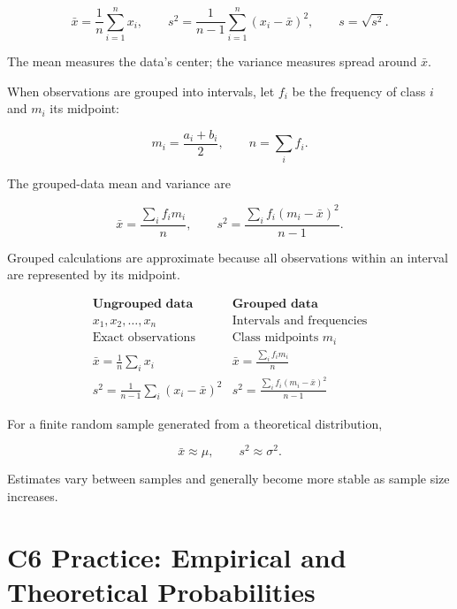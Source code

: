 $$
\bar{x}
=
\frac{1}{n}\sum_{i=1}^{n}x_i,
\qquad
s^2
=
\frac{1}{n-1}\sum_{i=1}^{n}(x_i-\bar{x})^2,
\qquad
s=\sqrt{s^2}.
$$

The mean measures the data's center; the variance measures spread around
$\bar{x}$.

When observations are grouped into intervals, let $f_i$ be the frequency of
class $i$ and $m_i$ its midpoint:

$$
m_i=\frac{a_i+b_i}{2},
\qquad
n=\sum_i f_i.
$$

The grouped-data mean and variance are

$$
\bar{x}
=
\frac{\sum_i f_i m_i}{n},
\qquad
s^2
=
\frac{\sum_i f_i(m_i-\bar{x})^2}{n-1}.
$$

Grouped calculations are approximate because all observations within an
interval are represented by its midpoint.

$$
\boxed{
	\begin{array}{c|c}
		\textbf{Ungrouped data} & \textbf{Grouped data}\\ \hline
		x_1,x_2,\ldots,x_n & \text{Intervals and frequencies}\\
		\text{Exact observations} & \text{Class midpoints }m_i\\
		\displaystyle
		\bar{x}=\frac{1}{n}\sum_i x_i
		&
		\displaystyle
		\bar{x}=\frac{\sum_i f_i m_i}{n}
		\\[3mm]
		\displaystyle
		s^2=\frac{1}{n-1}\sum_i(x_i-\bar{x})^2
		&
		\displaystyle
		s^2=\frac{\sum_i f_i(m_i-\bar{x})^2}{n-1}
\end{array}}
$$

For a finite random sample generated from a theoretical distribution,

$$
\bar{x}\approx\mu,
\qquad
s^2\approx\sigma^2.
$$

Estimates vary between samples and generally become more stable as sample
size increases.



\section{C6 Practice: Empirical and Theoretical Probabilities}
\label{sec:c6-only-practice}

\vspace{5mm}

